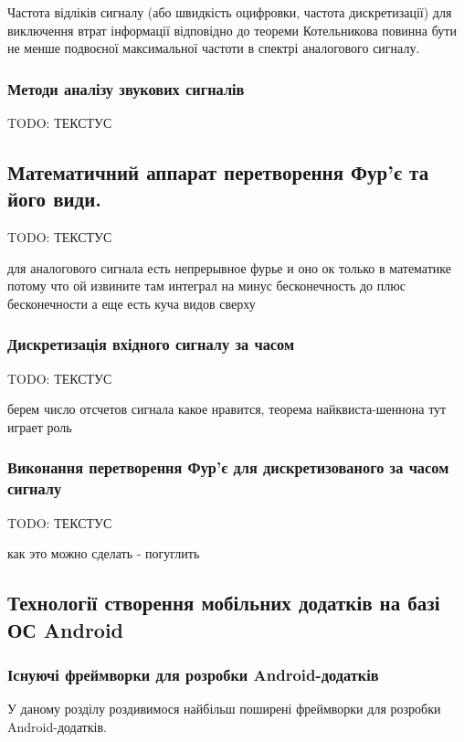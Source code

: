 Частота відліків сигналу (або швидкість оцифровки, частота дискретизації) для виключення втрат інформації відповідно до теореми Котельникова повинна бути не менше подвоєної максимальної частоти в спектрі аналогового сигналу.
\cite{панфилов1991теория}

\subsubsection{Методи аналізу звукових сигналів}

TODO: ТЕКСТУС

\subsection{Математичний аппарат перетворення Фур'є та його види.}

TODO: ТЕКСТУС

для аналогового сигнала есть непрерывное фурье и оно ок только в математике потому что ой извините там интеграл на минус бесконечность до плюс бесконечности
а еще есть куча видов сверху

\subsubsection{Дискретизація вхідного сигналу за часом}

TODO: ТЕКСТУС

берем число отсчетов сигнала какое нравится, теорема найквиста-шеннона тут играет роль

\subsubsection{Виконання перетворення Фур'є для дискретизованого за часом сигналу}

TODO: ТЕКСТУС

как это можно сделать - погуглить


\subsection{Технології створення мобільних додатків на базі ОС Android}

\subsubsection{Існуючі фреймворки для розробки Android-додатків}

У даному розділу роздивимося найбільш поширені фреймворки для розробки Android-додатків.

